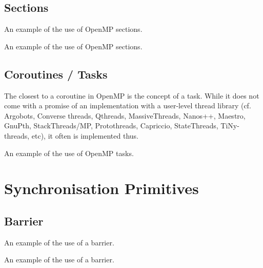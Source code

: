 \subsection{Sections}

\raggedbottom
\begin{codebox}[]{\href{https://godbolt.org/z/}{\ExternalLink}}
\footnotesize An example of the use of OpenMP sections.
\tcblower
{}
\end{codebox}

\raggedbottom
\begin{codebox}[]{\href{https://godbolt.org/z/}{\ExternalLink}}
\footnotesize An example of the use of OpenMP sections.
\tcblower
{}
\end{codebox}

\subsection{Coroutines / Tasks}

The closest to a coroutine in OpenMP is the concept of a task. While it does not come with a promise of an implementation with a user-level thread library (cf. Argobots, Converse threads,	Qthreads,	MassiveThreads, Nanos++, Maestro, GnuPth, StackThreads/MP, Protothreads, Capriccio, StateThreads, TiNy-threads, etc), it often is implemented thus.  

\raggedbottom
\begin{codebox}[]{\href{https://godbolt.org/z/}{\ExternalLink}}
\footnotesize An example of the use of OpenMP tasks.
\tcblower
{}
\end{codebox}

\section{Synchronisation Primitives}

\subsection{Barrier}

\raggedbottom
\begin{codebox}[]{\href{https://godbolt.org/z/}{\ExternalLink}}
\footnotesize An example of the use of a barrier.
\tcblower
{}
\end{codebox}

\raggedbottom
\begin{codebox}[]{\href{https://godbolt.org/z/}{\ExternalLink}}
\footnotesize An example of the use of a barrier.
\tcblower
{}
\end{codebox}

